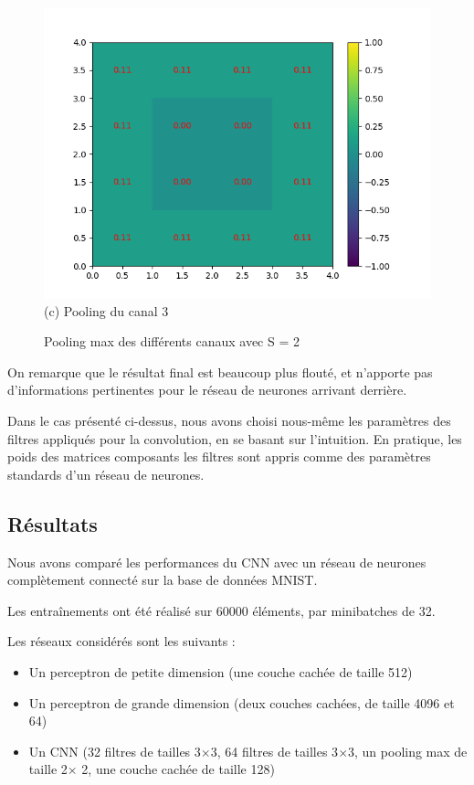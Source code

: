 \begin{figure}[h]
        \includegraphics[width=\textwidth]{img/cnn_exemple/square/stride_3_max.png}
        \center 
        (c) Pooling du canal 3
    \endminipage
    \caption{Pooling max des différents canaux avec S = 2} 
\end{figure}

On remarque que le résultat final est beaucoup plus flouté, et n'apporte pas d'informations pertinentes pour le réseau de 
neurones arrivant derrière.

Dans le cas présenté ci-dessus, nous avons choisi nous-même les paramètres des filtres appliqués pour la convolution,
en se basant sur l'intuition.
En pratique, les poids des matrices composants les filtres sont appris comme des paramètres standards d'un réseau de neurones.

\subsection{Résultats}

Nous avons comparé les performances du CNN avec un réseau de neurones complètement connecté sur la base de données MNIST.

Les entraînements ont été réalisé sur 60000 éléments, par minibatches de 32.

Les réseaux considérés sont les suivants : 
\begin{itemize}
    \item Un perceptron de petite dimension (une couche cachée de taille 512)
    \item Un perceptron de grande dimension (deux couches cachées, de taille 4096 et 64)
    \item Un CNN (32 filtres de tailles 3$\times$3, 64 filtres de tailles 3$\times$3, un pooling max de taille 2$\times$ 2, une couche cachée de taille 128)
\end{itemize}

